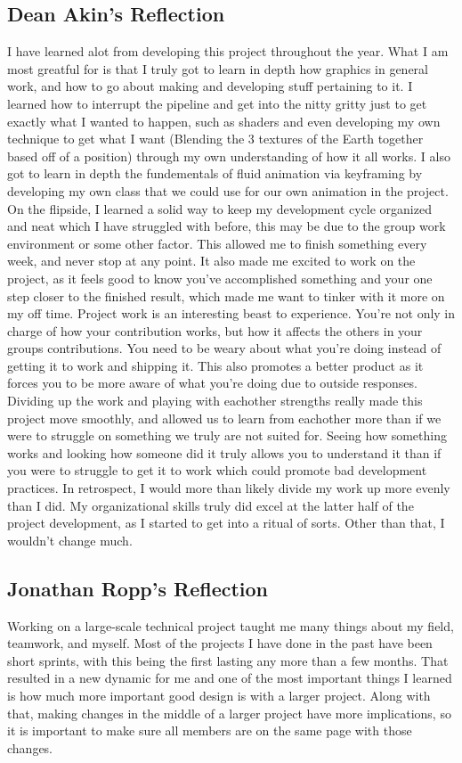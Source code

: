 \documentclass[onecolumn, draftclsnofoot,10pt, compsoc]{IEEEtran}
\begin{document}
\subsection{Dean Akin's Reflection}
I have learned alot from developing this project throughout the year. What I am most greatful for is that I truly got to learn in depth how graphics in general work, and how to go about making and developing stuff pertaining to it. I learned how to interrupt the pipeline and get into the nitty gritty just to get exactly what I wanted to happen, such as shaders and even developing my own technique to get what I want (Blending the 3 textures of the Earth together based off of a position) through my own understanding of how it all works. I also got to learn in depth the fundementals of fluid animation via keyframing by developing my own class that we could use for our own animation in the project. 
On the flipside, I learned a solid way to keep my development cycle organized and neat which I have struggled with before, this may be due to the group work environment or some other factor. This allowed me to finish something every week, and never stop at any point. It also made me excited to work on the project, as it feels good to know you've accomplished something and your one step closer to the finished result, which made me want to tinker with it more on my off time.
Project work is an interesting beast to experience. You're not only in charge of how your contribution works, but how it affects the others in your groups contributions. You need to be weary about what you're doing instead of getting it to work and shipping it. This also promotes a better product as it forces you to be more aware of what you're doing due to outside responses.
Dividing up the work and playing with eachother strengths really made this project move smoothly, and allowed us to learn from eachother more than if we were to struggle on something we truly are not suited for. Seeing how something works and looking how someone did it truly allows you to understand it than if you were to struggle to get it to work which could promote bad development practices.
In retrospect, I would more than likely divide my work up more evenly than I did. My organizational skills truly did excel at the latter half of the project development, as I started to get into a ritual of sorts. Other than that, I wouldn't change much.


\subsection{Jonathan Ropp's Reflection}
Working on a large-scale technical project taught me many things about my field, teamwork, and myself. Most of the projects I have done in the past have been short sprints, with this being the first lasting any more than a few months. That resulted in a new dynamic for me and one of the most important things I learned is how much more important good design is with a larger project. Along with that, making changes in the middle of a larger project have more implications, so it is important to make sure all members are on the same page with those changes. 
\end{document}
